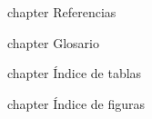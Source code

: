 \documentclass[a4paper,12pt,proyecto]{iietesis}
\begin{document}
\backmatter


\newpage{} {chapter} {Referencias}%



\printglossaries
{} {chapter} {Glosario}

\newpage{} {chapter} {\'Indice de tablas}%
\listoftables %

\newpage\newpage{} {chapter} {\'Indice de figuras}%
\listoffigures %




\lastpage
\end{document}
